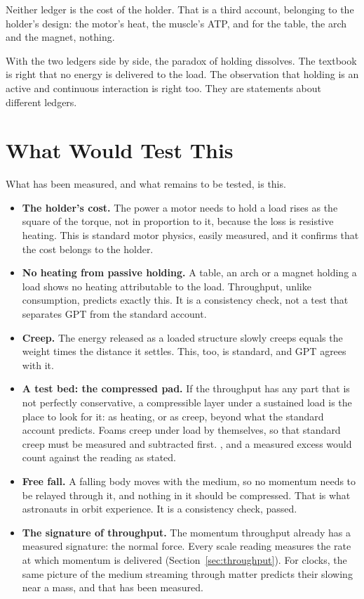 \documentclass[11pt,a4paper]{article}
\begin{document}
Neither ledger is the cost of the holder. That is a third account, belonging to the holder's design: the motor's heat, the muscle's ATP, and for the table, the arch and the magnet, nothing.

With the two ledgers side by side, the paradox of holding dissolves. The textbook is right that no energy is delivered to the load. The observation that holding is an active and continuous interaction is right too. They are statements about different ledgers.

\section{What Would Test This}

What has been measured, and what remains to be tested, is this.

\begin{itemize}
\item \textbf{The holder's cost.} The power a motor needs to hold a load rises as the square of the torque, not in proportion to it, because the loss is resistive heating. This is standard motor physics, easily measured, and it confirms that the cost belongs to the holder.
\item \textbf{No heating from passive holding.} A table, an arch or a magnet holding a load shows no heating attributable to the load. Throughput, unlike consumption, predicts exactly this. It is a consistency check, not a test that separates GPT from the standard account.
\item \textbf{Creep.} The energy released as a loaded structure slowly creeps equals the weight times the distance it settles. This, too, is standard, and GPT agrees with it.
\item \textbf{A test bed: the compressed pad.} If the throughput has any part that is not perfectly conservative, a compressible layer under a sustained load is the place to look for it: as heating, or as creep, beyond what the standard account predicts. Foams creep under load by themselves, so that standard creep must be measured and subtracted first. , and a measured excess would count against the reading as stated.
\item \textbf{Free fall.} A falling body moves with the medium, so no momentum needs to be relayed through it, and nothing in it should be compressed. That is what astronauts in orbit experience. It is a consistency check, passed.
\item \textbf{The signature of throughput.} The momentum throughput already has a measured signature: the normal force. Every scale reading measures the rate at which momentum is delivered (Section~\ref{sec:throughput}). For clocks, the same picture of the medium streaming through matter predicts their slowing near a mass, and that has been measured. 
\end{itemize}
\end{document}

